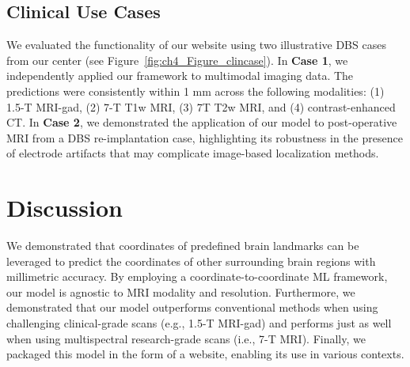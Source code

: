 \subsection{Clinical Use Cases}
We evaluated the functionality of our website using two illustrative DBS cases from our center (see Figure~\ref{fig:ch4_Figure_clincase}). In \textbf{Case 1}, we independently applied our framework to multimodal imaging data. The predictions were consistently within 1 mm across the following modalities: (1) 1.5-T MRI-gad, (2) 7-T T1w MRI, (3) 7T T2w MRI, and (4) contrast-enhanced CT. In \textbf{Case 2}, we demonstrated the application of our model to post-operative MRI from a DBS re-implantation case, highlighting its robustness in the presence of electrode artifacts that may complicate image-based localization methods.

\section{Discussion}
We demonstrated that coordinates of predefined brain landmarks can be leveraged to predict the coordinates of other surrounding brain regions with millimetric accuracy. By employing a coordinate-to-coordinate ML framework, our model is agnostic to MRI modality and resolution. Furthermore, we demonstrated that our model outperforms conventional methods when using challenging clinical-grade scans (e.g., 1.5-T MRI-gad) and performs just as well when using multispectral research-grade scans (i.e., 7-T MRI). Finally, we packaged this model in the form of a website, enabling its use in various contexts.

